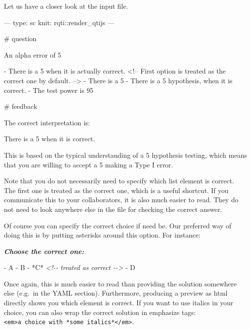 \documentclass[twoside]{tufte-book}
\newenvironment{Shaded}{}{}
\newcommand{\AnnotationTok}[1]{\textcolor[rgb]{0.38,0.63,0.69}{\textbf{\textit{#1}}}}
\newcommand{\CommentTok}[1]{\textcolor[rgb]{0.38,0.63,0.69}{\textit{#1}}}
\newcommand{\NormalTok}[1]{#1}
\newcommand{\SpecialStringTok}[1]{\textcolor[rgb]{0.73,0.40,0.53}{#1}}
\begin{document}
Let us have a closer look at the input file.

\begin{Shaded}
\begin{Highlighting}
---
type: sc
knit: rqti::render_qtijs
---

# question

An alpha error of 5% means that:

- There is a 5% probability that you will mistakenly reject the null hypothesis,
when it is actually correct. <!-- First option is treated as the correct one by
default. -->
- There is a 5% probability that the null hypothesis is correct.
- There is a 5% probability that you will mistakenly reject the alternative
hypothesis, when it is correct.
- The test power is 95%.

# feedback

The correct interpretation is:

There is a 5% probability that you will mistakenly reject the null hypothesis,
when it is correct.

This is based on the typical understanding of a 5% significance level in
hypothesis testing, which means that you are willing to accept a 5% chance of
making a Type I error.
\end{Highlighting}
\end{Shaded}

Note that you do not necessarily need to specify which list element is correct. The first one is treated as the correct one, which is a useful shortcut. If you communicate this to your collaborators, it is also much easier to read. They do not need to look anywhere else in the file for checking the correct answer.

Of course you can specify the correct choice if need be. Our preferred way of doing this is by putting asterisks around this option. For instance:

\begin{Shaded}
\begin{Highlighting}[]
\AnnotationTok{Choose the correct one:}

\SpecialStringTok{{-} }\NormalTok{A}
\SpecialStringTok{{-} }\NormalTok{B}
\SpecialStringTok{{-} }\NormalTok{*C* }\CommentTok{\textless{}!{-}{-} treated as correct {-}{-}\textgreater{}}
\SpecialStringTok{{-} }\NormalTok{D}
\end{Highlighting}
\end{Shaded}

Once again, this is much easier to read than providing the solution somewhere else (e.g.~in the YAML section). Furthermore, producing a preview as html directly shows you which element is correct. If you want to use italics in your choice, you can also wrap the correct solution in emphasize tags: \texttt{\textless{}em\textgreater{}a\ choice\ with\ *some\ italics*\textless{}/em\textgreater{}}.
\end{document}
